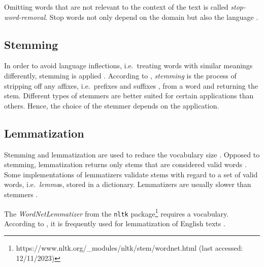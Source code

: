 Omitting words that are not relevant to the context of the text is called \textit{stop-word-removal}.
Stop words not only depend on the domain but also the language \cite{IR2011}.


\subsection{Stemming}\label{subsec:stemming}

In order to avoid language inflections, i.e.\ treating words with similar meanings differently, stemming is applied \cite{clusteringDocs2020}.
According to \citeauthor{nlp-book2009}, \textit{stemming} is the process of stripping off any affixes, i.e.\ prefixes and suffixes \cite{IR2011}, 
from a word and returning the stem.
Different types of stemmers are better suited for certain applications than others.
Hence, the choice of the stemmer depends on the application.



\subsection{Lemmatization}\label{subsec:lemmatization}

Stemming and lemmatization are used to reduce the vocabulary size \cite{clusteringDocs2020}.
Opposed to stemming, lemmatization returns only stems that are considered valid words \cite{nlp-book2009}.
Some implementations of lemmatizers validate stems with regard to a set of valid words, i.e.\ \textit{lemma}s, stored in a dictionary.
Lemmatizers are usually slower than stemmers \cite{nlp-book2009}.

The \textit{WordNetLemmatizer} from the \texttt{nltk} package\footnote{https://www.nltk.org/\_modules/nltk/stem/wordnet.html (last accessed: 12/11/2023)} requires a vocabulary. %
According to \citeauthor{clusteringDocs2020}, it is frequently used for lemmatization of English texts \cite{clusteringDocs2020}.




